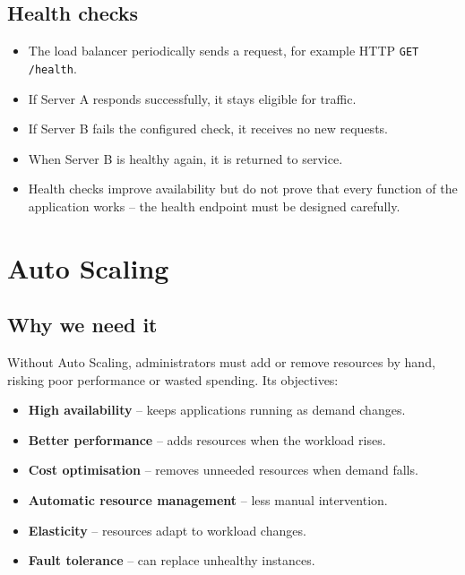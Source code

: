 \documentclass[11pt,a4paper]{article}
\begin{document}

\subsection{Health checks}


\begin{itemize}\itemsep2pt
  \item The load balancer periodically sends a request, for example HTTP \texttt{GET /health}.
  \item If Server A responds successfully, it stays eligible for traffic.
  \item If Server B fails the configured check, it receives no new requests.
  \item When Server B is healthy again, it is returned to service.
  \item Health checks improve availability but do not prove that every function of the
        application works -- the health endpoint must be designed carefully.
\end{itemize}

\section{Auto Scaling}




\subsection{Why we need it}

Without Auto Scaling, administrators must add or remove resources by hand, risking poor
performance or wasted spending. Its objectives:

\begin{itemize}\itemsep2pt
  \item \textbf{High availability} -- keeps applications running as demand changes.
  \item \textbf{Better performance} -- adds resources when the workload rises.
  \item \textbf{Cost optimisation} -- removes unneeded resources when demand falls.
  \item \textbf{Automatic resource management} -- less manual intervention.
  \item \textbf{Elasticity} -- resources adapt to workload changes.
  \item \textbf{Fault tolerance} -- can replace unhealthy instances.
\end{itemize}
\end{document}
